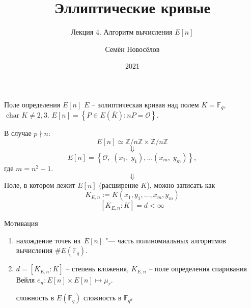 \documentclass{beamer}
\title{Эллиптические кривые}
\subtitle{Лекция 4. Алгоритм вычисления $E[n]$}
\author{Семён Новосёлов}
\institute{БФУ им. И. Канта}
\date{2021}
\begin{document}
\frame{\titlepage}

\begin{frame}{Поле определения $E[n]$}
$E$ -- эллиптическая кривая над полем $K = \mathbb{F}_q$, $\operatorname{char}{K} \ne 2,3$.
     $E[n] = \left\{ {P \in E\left( \bar{K} \right) : nP = \mathcal{O}} \right\}$.

    В случае $p \nmid n$:
    \[
    E\left[ n \right] \simeq \mathbb{Z}/n\mathbb{Z} \times \mathbb{Z}/n\mathbb{Z}
    \]
    \[\Downarrow\]
    \[
    E\left[n\right] = \left\{ {\mathcal{O},\;\left( {{x_1},\;{y_1}} \right), ... \left( {{x_m},\;{y_m}} \right)} \right\},
    \]
    где $m=n^2-1$.
    \[\Downarrow\]
    Поле, в котором лежит $E\left[ n \right]$ (расширение
    $K$), можно записать как
    \[
    K_{E,n} := K\left( {{x_1}, {y_1}, \ldots, x_m, y_m} \right)
    \]
    \[
    \left[ K_{E,n} : K \right] = d < \infty 
    \]
\end{frame}

\begin{frame}{Мотивация}
    \begin{enumerate}
        \item нахождение точек из~$E[n]$ "--- часть полиномиальных алгоритмов вычисления $\#E(\mathbb{F}_q)$.
        \item $d = [K_{E,n} : K]$ -- степень вложения, $K_{E,n}$ -- поле определения спаривания Вейля $e_n: E[n] \times E[n] \mapsto \mu_r$.
        \begin{center}
            \structure{$\Downarrow$}
        \end{center}
            сложность  в $E(\mathbb{F}_q)$ \structure{$\rightleftarrows$} сложность  в $\mathbb{F}_{q^{d}}$
    \end{enumerate}
\end{frame}
\end{document}
